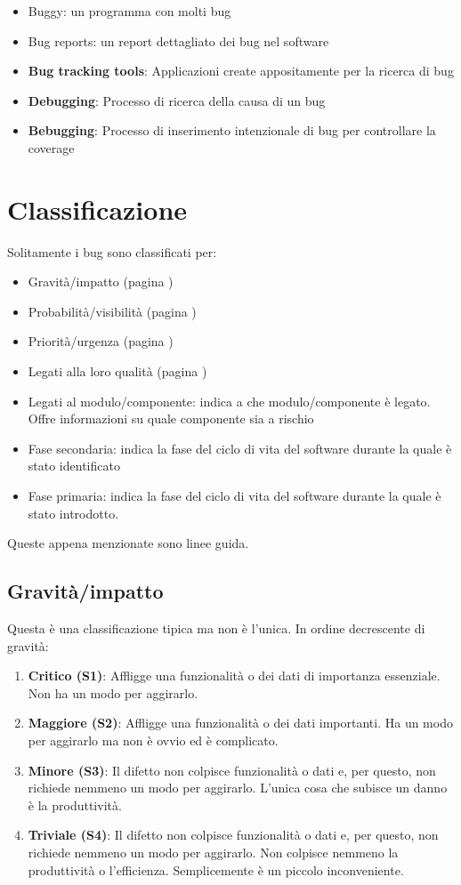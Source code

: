 \documentclass[11pt,a4paper]{book}
\begin{document}
\begin{itemize}
	\item Buggy: un programma con molti bug
	\item Bug reports: un report dettagliato dei bug nel software
	\item \textbf{Bug tracking tools}: Applicazioni create appositamente per la ricerca di bug
	\item \textbf{Debugging}: Processo di ricerca della causa di un bug
	\item \textbf{Bebugging}: Processo di inserimento intenzionale di bug per controllare la coverage
\end{itemize}

\section{Classificazione}
Solitamente i bug sono classificati per:
\begin{itemize}
	\item Gravità/impatto (pagina \pageref{par: Defect severity})
	\item Probabilità/visibilità (pagina \pageref{par: Defect probabilty})
	\item Priorità/urgenza (pagina \pageref{par: Defect priority})
	\item Legati alla loro qualità (pagina \pageref{par: Dimension Quality})
	\item Legati al modulo/componente: indica a che modulo/componente è legato. Offre informazioni su quale componente sia a rischio
	\item Fase secondaria: indica la fase del ciclo di vita del software durante la quale è stato identificato
	\item Fase primaria: indica la fase del ciclo di vita del software durante la quale è stato introdotto.
\end{itemize}

Queste appena menzionate sono linee guida.

\subsection{Gravità/impatto} \label{par: Defect severity}
Questa è una classificazione tipica ma non è l'unica. In ordine decrescente di gravità:
\begin{enumerate}
	\item \textbf{Critico (S1)}: Affligge una funzionalità o dei dati di importanza essenziale. Non ha un modo per aggirarlo.
	\item \textbf{Maggiore (S2)}: Affligge una funzionalità o dei dati importanti. Ha un modo per aggirarlo ma non è ovvio ed è complicato. 
	\item \textbf{Minore (S3)}: Il difetto non colpisce funzionalità o dati e, per questo, non richiede nemmeno un modo per aggirarlo. L'unica cosa che subisce un danno è la produttività.
	\item \textbf{Triviale (S4)}: Il difetto non colpisce funzionalità o dati e, per questo, non richiede nemmeno un modo per aggirarlo. Non colpisce nemmeno la produttività o l'efficienza. Semplicemente è un piccolo inconveniente.
\end{enumerate}
\end{document}
